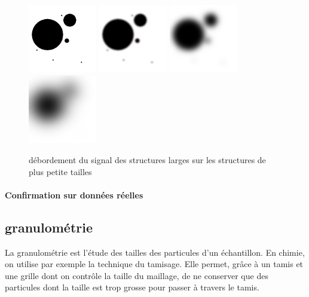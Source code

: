 \begin{figure}
  \centering
  \includegraphics[height=3cm]{Images/gaussian_spilling_init.png}
  \includegraphics[height=3cm]{Images/gaussian_spilling_g10.png}
  \includegraphics[height=3cm]{Images/gaussian_spilling_g40.png}
  \includegraphics[height=3cm]{Images/gaussian_spilling_g100.png}
  \label{fig:scale_space_spilling}
  \caption{débordement du signal des structures larges sur les structures de plus petite tailles}
\end{figure}



\paragraph{Confirmation sur données réelles}


\subsection{granulométrie}
\label{sec:EA:rehaussement:echelle:granulometrie}

La granulométrie est l'étude des tailles des particules d'un échantillon. En chimie, on utilise par exemple la technique du tamisage. Elle permet, grâce à un tamis et une grille dont on contrôle la taille du maillage, de ne conserver que des particules dont la taille est trop grosse pour passer à travers le tamis.


